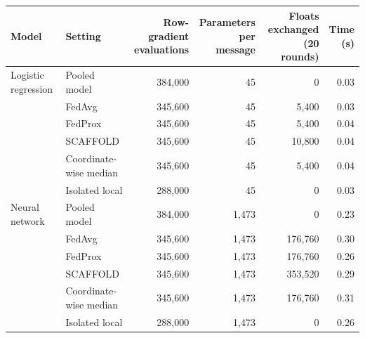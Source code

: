 \begin{tabular}{llrrrr}
\toprule
Model & Setting & \makecell{Row-gradient\\evaluations} & \makecell{Parameters\\per message} & \makecell{Floats exchanged\\(20 rounds)} & \makecell{Time\\(s)} \\
\midrule
Logistic regression & Pooled model & 384,000 & 45 & 0 & 0.03 \\
 & FedAvg & 345,600 & 45 & 5,400 & 0.03 \\
 & FedProx & 345,600 & 45 & 5,400 & 0.04 \\
 & SCAFFOLD & 345,600 & 45 & 10,800 & 0.04 \\
 & Coordinate-wise median & 345,600 & 45 & 5,400 & 0.04 \\
 & Isolated local & 288,000 & 45 & 0 & 0.03 \\
\midrule
Neural network & Pooled model & 384,000 & 1,473 & 0 & 0.23 \\
 & FedAvg & 345,600 & 1,473 & 176,760 & 0.30 \\
 & FedProx & 345,600 & 1,473 & 176,760 & 0.26 \\
 & SCAFFOLD & 345,600 & 1,473 & 353,520 & 0.29 \\
 & Coordinate-wise median & 345,600 & 1,473 & 176,760 & 0.31 \\
 & Isolated local & 288,000 & 1,473 & 0 & 0.26 \\
\bottomrule
\end{tabular}
